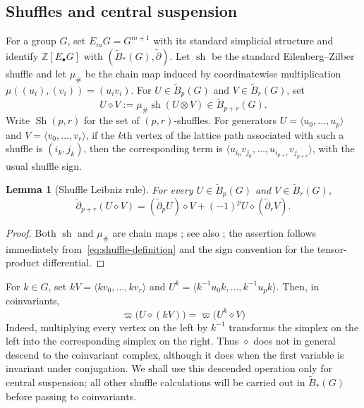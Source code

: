 \documentclass[11pt]{article}
\newtheorem{lemma}[theorem]{Lemma}
\newcommand{\ZZ}{\mathbb Z}
\newcommand{\tB}{\widetilde B}
\newcommand{\td}{\widetilde\partial}
\begin{document}
\subsection{Shuffles and central suspension}
\label{subsec:shuffle-and-suspension}

For a group $G$, set $E_mG=G^{m+1}$ with its standard simplicial
structure and identify $\ZZ[E_\bullet G]$ with $(\tB_*(G),\td)$. Let
$\operatorname{sh}$ be the standard Eilenberg--Zilber shuffle and let
$\mu_\#$ be the chain map induced by coordinatewise multiplication
$\mu((u_i),(v_i))=(u_iv_i)$. For $U\in\tB_p(G)$ and $V\in\tB_r(G)$, set
\begin{equation}
 U\diamond V
 :=\mu_\#\operatorname{sh}(U\otimes V)
 \in\tB_{p+r}(G).
 \label{eq:shuffle-definition}
\end{equation}
Write $\operatorname{Sh}(p,r)$ for
the set of $(p,r)$-shuffles. For generators
$U=\langle u_0,\ldots,u_p\rangle$ and
$V=\langle v_0,\ldots,v_r\rangle$, if the $k$th vertex of the lattice path
associated with such a shuffle is $(i_k,j_k)$, then the corresponding term is
$\langle u_{i_0}v_{j_0},\ldots,u_{i_{p+r}}v_{j_{p+r}}\rangle$, with the usual
shuffle sign.

\begin{lemma}[Shuffle Leibniz rule]
For every $U\in\tB_p(G)$ and $V\in\tB_r(G)$,
\[
        \td_{p+r}(U\diamond V)
        =
        (\td_p U)\diamond V
        +(-1)^p U\diamond(\td_r V).
\]
\end{lemma}

\begin{proof}
Both $\operatorname{sh}$ and $\mu_\#$ are chain maps \cite{EilenbergZilber}; see also \cite[Chapter~VIII, \S8]{MacLaneHomology}; the assertion follows immediately from~\eqref{eq:shuffle-definition} and the sign convention for the tensor-product differential.
\end{proof}

For $k\in G$, set $kV=\langle kv_0,\ldots,kv_r\rangle$ and $U^k=\langle k^{-1}u_0k,\ldots,k^{-1}u_pk\rangle$. Then, in coinvariants,
\begin{equation}
        \varpi\bigl(U\diamond(kV)\bigr)
        =\varpi\bigl(U^k\diamond V\bigr)
        \label{eq:shuffle-conjugation}
\end{equation}
Indeed, multiplying every vertex on the left by $k^{-1}$ transforms the simplex on the left into the corresponding simplex on the right. Thus $\diamond$ does not in general descend to the coinvariant complex, although it does when the first variable is invariant under conjugation. We shall use this descended operation only for central suspension; all other shuffle calculations will be carried out in $\tB_*(G)$ before passing to coinvariants.
\end{document}

